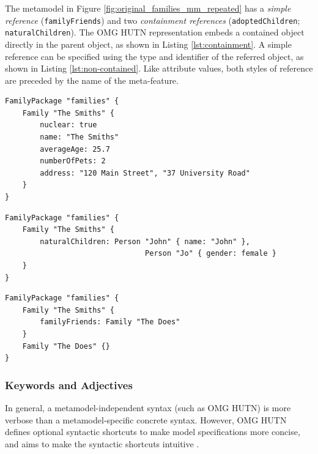 The metamodel in Figure \ref{fig:original_families_mm_repeated} has a \emph{simple reference} (\texttt{fa\-mi\-lyFr\-ie\-n\-ds}) and two \emph{containment references} (\texttt{ad\-op\-t\-edCh\-il\-dr\-en}; \texttt{na\-tu\-r\-alCh\-il\-dr\-en}). The OMG HUTN representation embeds a contained object directly in the parent object, as shown in Listing \ref{lst:containment}. A simple reference can be specified using the type and identifier of the referred object, as shown in Listing \ref{lst:non-contained}. Like attribute values, both styles of reference are preceded by the name of the meta-feature.

\begin{lstlisting}[caption={[Specifying attributes with HUTN]Specifying attributes with HUTN, taken from \cite{rose08hutn}}, label=lst:attributes, language=HutnFamilies]
FamilyPackage "families" {
    Family "The Smiths" {
        nuclear: true
        name: "The Smiths"
        averageAge: 25.7
        numberOfPets: 2
        address: "120 Main Street", "37 University Road"
    }
}
\end{lstlisting}

\begin{lstlisting}[caption={[Specifying a containment reference with HUTN]Specifying a containment reference with HUTN, taken from \cite{rose08hutn}}, label=lst:containment, language=HutnFamilies]
FamilyPackage "families" {
    Family "The Smiths" {
        naturalChildren: Person "John" { name: "John" },
                                Person "Jo" { gender: female }
    }
}
\end{lstlisting}


\begin{lstlisting}[caption={[Specifying a simple reference with HUTN]Specifying a simple reference with HUTN, taken from \cite{rose08hutn}}, label=lst:non-contained, language=HutnFamilies]
FamilyPackage "families" {
    Family "The Smiths" {
        familyFriends: Family "The Does"
    }
    Family "The Does" {}
}
\end{lstlisting}


\subsubsection{Keywords and Adjectives}
In general, a metamodel-independent syntax (such as OMG HUTN) is more verbose than a metamodel-specific concrete syntax. However, OMG HUTN defines optional syntactic shortcuts to make model specifications more concise, and aims to make the syntactic shortcuts intuitive \cite[pg2-4]{hutn}.


